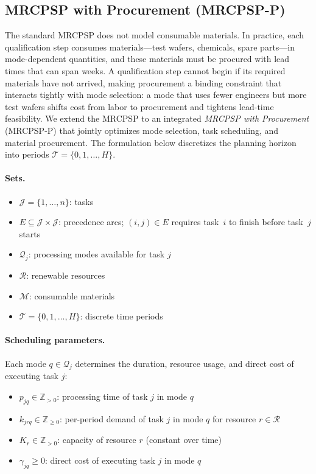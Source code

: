 \documentclass[11pt]{article}
\newcommand{\calJ}{\mathcal{J}}
\newcommand{\calM}{\mathcal{M}}
\newcommand{\calR}{\mathcal{R}}
\newcommand{\calQ}{\mathcal{Q}}
\newcommand{\calT}{\mathcal{T}}
\begin{document}
\subsection{MRCPSP with Procurement (MRCPSP-P)}

The standard MRCPSP does not model consumable materials.
In practice, each qualification step consumes materials---test wafers, chemicals, spare parts---in mode-dependent quantities, and these materials must be procured with lead times that can span weeks.
A qualification step cannot begin if its required materials have not arrived, making procurement a binding constraint that interacts tightly with mode selection: a mode that uses fewer engineers but more test wafers shifts cost from labor to procurement and tightens lead-time feasibility.
We extend the MRCPSP to an integrated \emph{MRCPSP with Procurement} (MRCPSP-P) that jointly optimizes mode selection, task scheduling, and material procurement.
The formulation below discretizes the planning horizon into periods $\calT = \{0, 1, \dots, H\}$.

\paragraph{Sets.}
\begin{itemize}
    \item $\calJ = \{1, \dots, n\}$: tasks
    \item $E \subseteq \calJ \times \calJ$: precedence arcs; $(i, j) \in E$ requires task~$i$ to finish before task~$j$ starts
    \item $\calQ_j$: processing modes available for task $j$
    \item $\calR$: renewable resources
    \item $\calM$: consumable materials
    \item $\calT = \{0, 1, \dots, H\}$: discrete time periods
\end{itemize}

\paragraph{Scheduling parameters.}
Each mode $q \in \calQ_j$ determines the duration, resource usage, and direct cost of executing task $j$:
\begin{itemize}
    \item $p_{jq} \in \mathbb{Z}_{>0}$: processing time of task $j$ in mode $q$
    \item $k_{jrq} \in \mathbb{Z}_{\geq 0}$: per-period demand of task $j$ in mode $q$ for resource $r \in \calR$
    \item $K_r \in \mathbb{Z}_{>0}$: capacity of resource $r$ (constant over time)
    \item $\gamma_{jq} \geq 0$: direct cost of executing task $j$ in mode $q$
\end{itemize}
\end{document}
